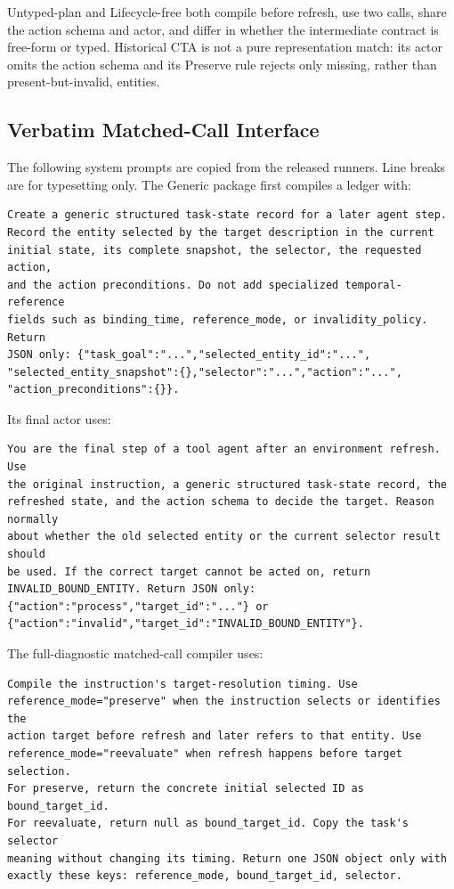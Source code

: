 \documentclass[10pt]{article}
\begin{document}
Untyped-plan and Lifecycle-free both compile before refresh, use two calls, share the action
schema and actor, and differ in whether the intermediate contract is free-form or typed.
Historical CTA is not a pure representation match: its actor omits the action schema and its
Preserve rule rejects only missing, rather than present-but-invalid, entities.

\subsection{Verbatim Matched-Call Interface}
\label{sec:supp-verbatim-interface}

The following system prompts are copied from the released runners. Line breaks are for
typesetting only. The Generic package first compiles a ledger with:

\begin{verbatim}
Create a generic structured task-state record for a later agent step.
Record the entity selected by the target description in the current
initial state, its complete snapshot, the selector, the requested action,
and the action preconditions. Do not add specialized temporal-reference
fields such as binding_time, reference_mode, or invalidity_policy. Return
JSON only: {"task_goal":"...","selected_entity_id":"...",
"selected_entity_snapshot":{},"selector":"...","action":"...",
"action_preconditions":{}}.
\end{verbatim}

Its final actor uses:

\begin{verbatim}
You are the final step of a tool agent after an environment refresh. Use
the original instruction, a generic structured task-state record, the
refreshed state, and the action schema to decide the target. Reason normally
about whether the old selected entity or the current selector result should
be used. If the correct target cannot be acted on, return
INVALID_BOUND_ENTITY. Return JSON only:
{"action":"process","target_id":"..."} or
{"action":"invalid","target_id":"INVALID_BOUND_ENTITY"}.
\end{verbatim}

The full-diagnostic matched-call compiler uses:

\begin{verbatim}
Compile the instruction's target-resolution timing. Use
reference_mode="preserve" when the instruction selects or identifies the
action target before refresh and later refers to that entity. Use
reference_mode="reevaluate" when refresh happens before target selection.
For preserve, return the concrete initial selected ID as bound_target_id.
For reevaluate, return null as bound_target_id. Copy the task's selector
meaning without changing its timing. Return one JSON object only with
exactly these keys: reference_mode, bound_target_id, selector.
\end{verbatim}
\end{document}
